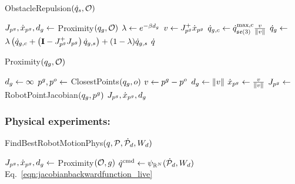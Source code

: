 
\begin{algorithm}[ht]
\caption{ObstacleRepulsion$(\dot{q}_{s}, \mathcal{O})$}
\begin{algorithmic}[1]
        \State $J_{p^g}, \dot x _{p^g}, d_g \gets$ Proximity$(q_g, \mathcal{O})$
        \State $\lambda \gets e^{-\beta d_g}$
        \State $v \gets J_{p^g}^+ \dot x_{p^g}$
        \State $\dot{q}_{g, c} \gets \dot{q}^\textrm{max,c}_{\mathfrak{se}(3)} \frac{v}{\| v \|}$
        \State $\dot{q}_g \gets$ $\lambda \left( \dot{q}_{g, c} + \left( \mathbf{I} - J_{p^g}^+ J_{p^g} \right) \dot{q}_{g,s} \right) + (1-\lambda) \dot{q}_{g,s}$
    \EndFor        
    \State \Return $\dot{q}$
\end{algorithmic}
\label{alg:obstaclerepulsion}
\end{algorithm}


\begin{algorithm}[ht]
\caption{Proximity$(q_g, \mathcal{O})$}
\label{alg:proximity}
\begin{algorithmic}[1]
    \State $d_g \gets \infty$
        \State $p^g, p^o \gets$ ClosestPoints$(q_g, o)$
        \State $v \gets p^g - p^o$
            \State $d_g \gets \| v \|$
            \State $\dot x_{p^g} \gets \frac{v}{\| v \|}$
            \State $J_{p^g} \gets$ RobotPointJacobian$(q_g, p^g)$
        \EndIf
    \EndFor
    \State \Return $J_{p^g}, \dot x_{p^g}, d_g$
\end{algorithmic}
\end{algorithm}


\subsubsection{Physical experiments:}
\label{sec:stretching_avoidance_controller_physical_robot_implementation}


\begin{algorithm}[ht]
\caption{FindBestRobotMotionPhys$(q, \mathcal{P}, \dot{\mathcal{P}}_d, W_d)$}
\label{alg:find_best_robot_motion_physical}
\begin{algorithmic}[1]
        \State $J_{p^g}, \dot x _{p^g}, d_g \gets$ Proximity$(\mathcal{O}, g)$
    \EndFor
    \State $\dot{q}^{\textrm{cmd}} \gets \psi_{\mathbb{R}^{N}} (\dot{\mathcal{P}}_d, W_d)$ \hfill Eq.~\eqref{eqn:jacobianbackwardfunction_live}
\end{algorithmic}
\end{algorithm}

